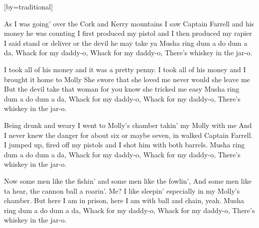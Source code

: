 

[by=traditional]

\begin{LARGE}


\chordsoff

\beginverse
As I was going' over the Cork and Kerry mountains
I saw Captain Farrell and his money he was counting
I first produced my pistol and I then produced my rapier
I said stand or deliver or the devil he may take ya
Musha ring dum a do dum a da, Whack for my daddy-o,
Whack for my daddy-o, There's whiskey in the jar-o.
\endverse

\beginverse
I took all of his money and it was a pretty penny.
I took all of his money and I brought it home to Molly
She swore that she loved me never would she leave me
But the devil take that woman for you know she tricked me easy
Musha ring dum a do dum a da, Whack for my daddy-o,
Whack for my daddy-o, There's whiskey in the jar-o.
\endverse

\beginverse
Being drunk and weary I went to Molly's chamber takin' my Molly with me
And I never knew the danger for about six or maybe seven, in walked Captain Farrell.
I jumped up, fired off my pistols and I shot him with both barrels.
Musha ring dum a do dum a da, Whack for my daddy-o,
Whack for my daddy-o, There's whiskey in the jar-o.
\endverse

\beginverse
Now some men like the fishin' and some men like the fowlin',
And some men like ta hear, the cannon ball a roarin'.
Me? I like sleepin' especially in my Molly's chamber.
But here I am in prison, here I am with ball and chain, yeah.
Musha ring dum a do dum a da, Whack for my daddy-o,
Whack for my daddy-o, There's whiskey in the jar-o.
\endverse




\end{LARGE}


\chordson
\endsong
